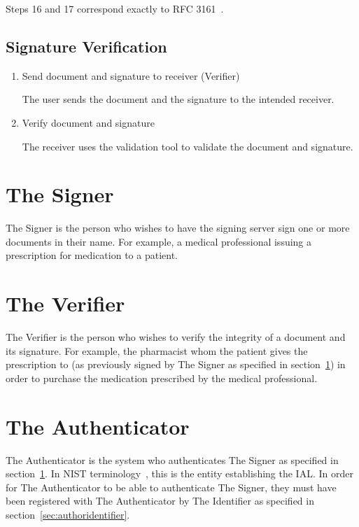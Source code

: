 Steps 16 and 17 correspond exactly to \gls{RFC} 3161~\cite{rfc3161}.

\subsection{Signature Verification}\label{subsec:signature-verification}
\begin{enumerate}[resume]
    \item Send document and signature to receiver (Verifier)

    The user sends the document and the signature to the intended receiver.

    \item Verify document and signature

    The receiver uses the validation tool to validate the document and signature.
\end{enumerate}

\section{The Signer}
\label{sec:actorsigner}
The Signer is the person who wishes to have the signing server sign one or more documents in their name.
For example, a medical professional issuing a prescription for medication to a patient.

\section{The Verifier}
\label{sec:actorverifier}
The Verifier is the person who wishes to verify the integrity of a document and its signature.
For example, the pharmacist whom the patient gives the prescription to (as previously signed by The Signer as specified in section~\ref{sec:actorsigner}) in order to purchase the medication prescribed by the medical professional.

\section{The Authenticator}
\label{sec:actorauthenticator}
The Authenticator is the system who authenticates The Signer as specified in section~\ref{sec:actorsigner}.
In \gls{NIST} terminology~\cite{nistdigitalidentityguidelines}, this is the entity establishing the \gls{IAL}.
In order for The Authenticator to be able to authenticate The Signer,
they must have been registered with The Authenticator by The Identifier as specified in section~\ref{sec:authoridentifier}.

